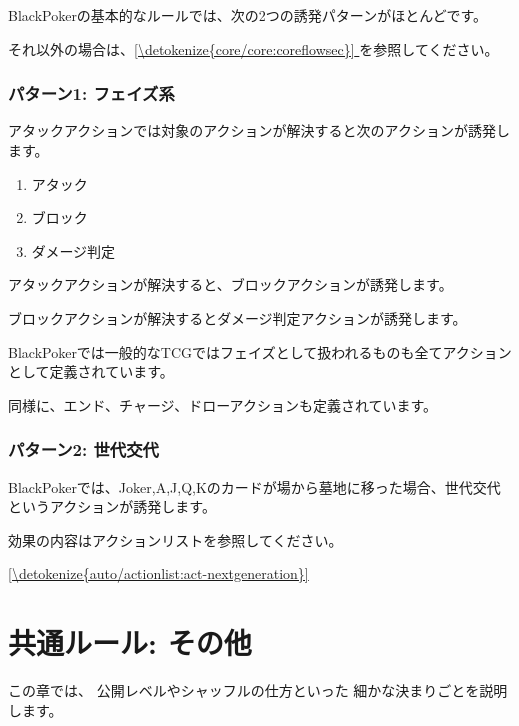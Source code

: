 \documentclass[letterpaper,10pt,dvipdfmx]{sphinxmanual}
\begin{document}
\sphinxAtStartPar
BlackPokerの基本的なルールでは、次の2つの誘発パターンがほとんどです。

\sphinxAtStartPar
それ以外の場合は、\hyperref[\detokenize{core/core:coreflowsec}]{\ref{\detokenize{core/core:coreflowsec}} } を参照してください。


\subsection{パターン1: フェイズ系}
\label{\detokenize{common/common-action:id17}}
\sphinxAtStartPar
アタックアクションでは対象のアクションが解決すると次のアクションが誘発します。
\begin{enumerate}
%
\item {} 
\sphinxAtStartPar
アタック

\item {} 
\sphinxAtStartPar
ブロック

\item {} 
\sphinxAtStartPar
ダメージ判定

\end{enumerate}

\sphinxAtStartPar
アタックアクションが解決すると、ブロックアクションが誘発します。

\sphinxAtStartPar
ブロックアクションが解決するとダメージ判定アクションが誘発します。

\sphinxAtStartPar
BlackPokerでは一般的なTCGではフェイズとして扱われるものも全てアクションとして定義されています。

\sphinxAtStartPar
同様に、エンド、チャージ、ドローアクションも定義されています。


\subsection{パターン2: 世代交代}
\label{\detokenize{common/common-action:id18}}
\sphinxAtStartPar
BlackPokerでは、Joker,A,J,Q,Kのカードが場から墓地に移った場合、世代交代というアクションが誘発します。

\sphinxAtStartPar
効果の内容はアクションリストを参照してください。

\sphinxAtStartPar
\hyperref[\detokenize{auto/actionlist:act-nextgeneration}]{\ref{\detokenize{auto/actionlist:act-nextgeneration}} }

\sphinxstepscope


\chapter{共通ルール: その他}
\label{\detokenize{common/common-etc:common-etc-rst}}\label{\detokenize{common/common-etc:id1}}\label{\detokenize{common/common-etc::doc}}
\sphinxAtStartPar
この章では、
公開レベルやシャッフルの仕方といった
細かな決まりごとを説明します。
\end{document}
